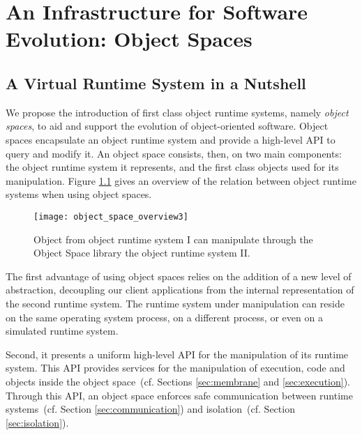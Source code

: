

\chapter{An Infrastructure for Software Evolution: Object Spaces}
\minitoc
\introduction

\section{A Virtual Runtime System in a Nutshell}

We propose the introduction of first class object runtime systems, namely \emph{object spaces}, to aid and support the evolution of object-oriented software.
Object spaces encapsulate an object runtime system and provide a high-level API to query and modify it. An object space consists, then, on two main components: the object runtime system it represents, and the first class objects used for its manipulation. Figure \ref{fig:objectSpaceOverview} gives an overview of the relation between object runtime systems when using object spaces.

\begin{figure}[htb]
\begin{center}
\texttt{[image: object\_space\_overview3]}
\caption{Object from object runtime system I can manipulate through the Object Space library the object runtime system II.\label{fig:objectSpaceOverview}}
\end{center}
\end{figure}

The first advantage of using object spaces relies on the addition of a new level of abstraction, decoupling our client applications from the internal representation of the second runtime system. The runtime system under manipulation can reside \eg on the same operating system process, on a different process, or even on a simulated runtime system.

Second, it presents a uniform high-level API for the manipulation of its runtime system. This API provides services for the manipulation of execution, code and objects inside the object space~(cf. Sections \ref{sec:membrane} and \ref{sec:execution}). Through this API, an object space enforces safe communication between runtime systems~(cf. Section \ref{sec:communication}) and isolation~(cf. Section \ref{sec:isolation}).

